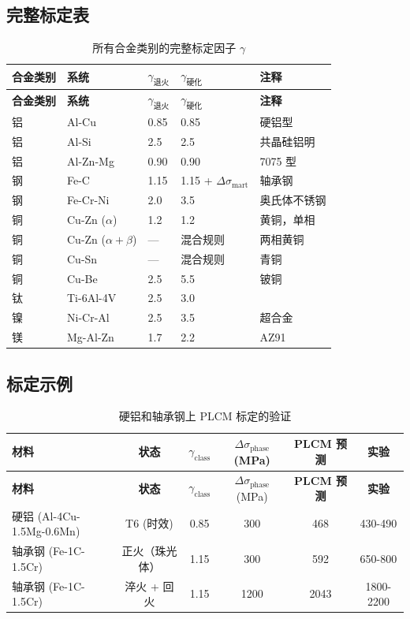 \documentclass[12pt,a4paper]{article}
\begin{document}
	\subsection{完整标定表}
	\label{subsec:complete-calibration}
	
	\begin{longtable}{p{3cm}p{2.5cm}p{2.5cm}p{2.5cm}p{4cm}}
		\caption{所有合金类别的完整标定因子 \(\gamma\)} \label{tab:complete-gamma} \\
		\toprule
		\textbf{合金类别} & \textbf{系统} & \(\gamma_{\text{退火}}\) & \(\gamma_{\text{硬化}}\) & \textbf{注释} \\
		\midrule
		\endfirsthead
		\toprule
		\textbf{合金类别} & \textbf{系统} & \(\gamma_{\text{退火}}\) & \(\gamma_{\text{硬化}}\) & \textbf{注释} \\
		\midrule
		\endhead
		铝 & Al-Cu & 0.85 & 0.85 & 硬铝型 \\
		铝 & Al-Si & 2.5 & 2.5 & 共晶硅铝明 \\
		铝 & Al-Zn-Mg & 0.90 & 0.90 & 7075 型 \\
		钢 & Fe-C & 1.15 & 1.15 + \(\Delta\sigma_{\text{mart}}\) & 轴承钢 \\
		钢 & Fe-Cr-Ni & 2.0 & 3.5 & 奥氏体不锈钢 \\
		铜 & Cu-Zn (\(\alpha\)) & 1.2 & 1.2 & 黄铜，单相 \\
		铜 & Cu-Zn (\(\alpha+\beta\)) & — & 混合规则 & 两相黄铜 \\
		铜 & Cu-Sn & — & 混合规则 & 青铜 \\
		铜 & Cu-Be & 2.5 & 5.5 & 铍铜 \\
		钛 & Ti-6Al-4V & 2.5 & 3.0 & \\
		镍 & Ni-Cr-Al & 2.5 & 3.5 & 超合金 \\
		镁 & Mg-Al-Zn & 1.7 & 2.2 & AZ91 \\
		\bottomrule
	\end{longtable}
	
	\subsection{标定示例}
	
	\begin{longtable}{lccccc}
		\caption{硬铝和轴承钢上 PLCM 标定的验证} \label{tab:calibration-validation} \\
		\toprule
		\textbf{材料} & \textbf{状态} & \(\gamma_{\text{class}}\) & \(\Delta\sigma_{\text{phase}}\) (MPa) & \textbf{PLCM 预测} & \textbf{实验} \\
		\midrule
		\endfirsthead
		\toprule
		\textbf{材料} & \textbf{状态} & \(\gamma_{\text{class}}\) & \(\Delta\sigma_{\text{phase}}\) (MPa) & \textbf{PLCM 预测} & \textbf{实验} \\
		\midrule
		\endhead
		硬铝 (Al-4Cu-1.5Mg-0.6Mn) & T6 (时效) & 0.85 & 300 & 468 & 430-490 \\
		轴承钢 (Fe-1C-1.5Cr) & 正火（珠光体） & 1.15 & 300 & 592 & 650-800 \\
		轴承钢 (Fe-1C-1.5Cr) & 淬火 + 回火 & 1.15 & 1200 & 2043 & 1800-2200 \\
		\bottomrule
	\end{longtable}
	
\end{document}
